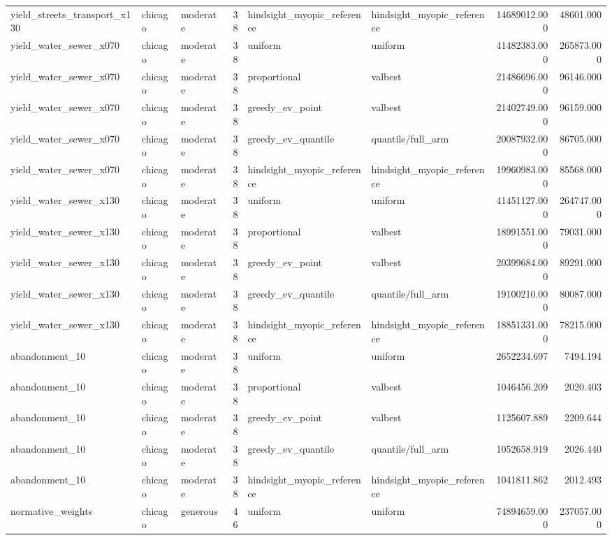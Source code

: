 \begin{tabular}{lllrllrr}
yield\_streets\_transport\_x130 & chicago & moderate & 38 & hindsight\_myopic\_reference & hindsight\_myopic\_reference & 14689012.000 & 48601.000 \\
yield\_water\_sewer\_x070 & chicago & moderate & 38 & uniform & uniform & 41482383.000 & 265873.000 \\
yield\_water\_sewer\_x070 & chicago & moderate & 38 & proportional & valbest & 21486696.000 & 96146.000 \\
yield\_water\_sewer\_x070 & chicago & moderate & 38 & greedy\_ev\_point & valbest & 21402749.000 & 96159.000 \\
yield\_water\_sewer\_x070 & chicago & moderate & 38 & greedy\_ev\_quantile & quantile/full\_arm & 20087932.000 & 86705.000 \\
yield\_water\_sewer\_x070 & chicago & moderate & 38 & hindsight\_myopic\_reference & hindsight\_myopic\_reference & 19960983.000 & 85568.000 \\
yield\_water\_sewer\_x130 & chicago & moderate & 38 & uniform & uniform & 41451127.000 & 264747.000 \\
yield\_water\_sewer\_x130 & chicago & moderate & 38 & proportional & valbest & 18991551.000 & 79031.000 \\
yield\_water\_sewer\_x130 & chicago & moderate & 38 & greedy\_ev\_point & valbest & 20399684.000 & 89291.000 \\
yield\_water\_sewer\_x130 & chicago & moderate & 38 & greedy\_ev\_quantile & quantile/full\_arm & 19100210.000 & 80087.000 \\
yield\_water\_sewer\_x130 & chicago & moderate & 38 & hindsight\_myopic\_reference & hindsight\_myopic\_reference & 18851331.000 & 78215.000 \\
abandonment\_10 & chicago & moderate & 38 & uniform & uniform & 2652234.697 & 7494.194 \\
abandonment\_10 & chicago & moderate & 38 & proportional & valbest & 1046456.209 & 2020.403 \\
abandonment\_10 & chicago & moderate & 38 & greedy\_ev\_point & valbest & 1125607.889 & 2209.644 \\
abandonment\_10 & chicago & moderate & 38 & greedy\_ev\_quantile & quantile/full\_arm & 1052658.919 & 2026.440 \\
abandonment\_10 & chicago & moderate & 38 & hindsight\_myopic\_reference & hindsight\_myopic\_reference & 1041811.862 & 2012.493 \\
normative\_weights & chicago & generous & 46 & uniform & uniform & 74894659.000 & 237057.000 \\

\end{tabular}
